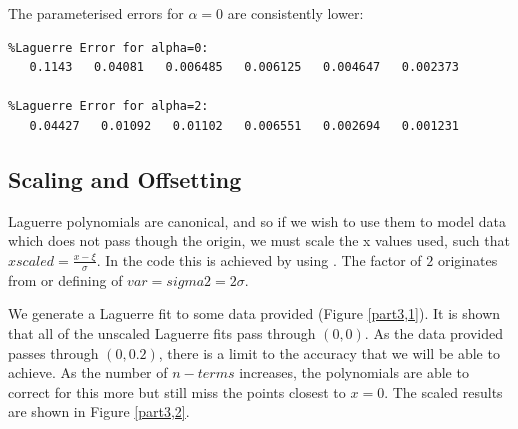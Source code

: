 \documentclass{article}
\begin{document}
The parameterised errors for $\alpha = 0$ are consistently lower: 
\begin{lstlisting}
%Laguerre Error for alpha=0:
   0.1143   0.04081   0.006485   0.006125   0.004647   0.002373

%Laguerre Error for alpha=2:
   0.04427   0.01092   0.01102   0.006551   0.002694   0.001231
\end{lstlisting}











\subsection{Scaling and Offsetting}



Laguerre polynomials are canonical, and so if we wish to use them to model data which does not pass though the origin, we must scale the x values used, such that $xscaled = \frac{x - \xi}{\sigma}$. In the code this is achieved by using . The factor of $2$ originates from or defining of $var = sigma2 = 2\sigma $. 

We generate a Laguerre fit to some data provided (Figure \ref{part3,1}). It is shown that all of the unscaled Laguerre fits pass through $(0,0)$. As the data provided passes through $(0,0.2)$, there is a limit to the accuracy that we will be able to achieve. As the number of $n-terms$ increases, the polynomials are able to correct for this more but still miss the points closest to $x=0$. The scaled results are shown in Figure \ref{part3,2}.
\end{document}
